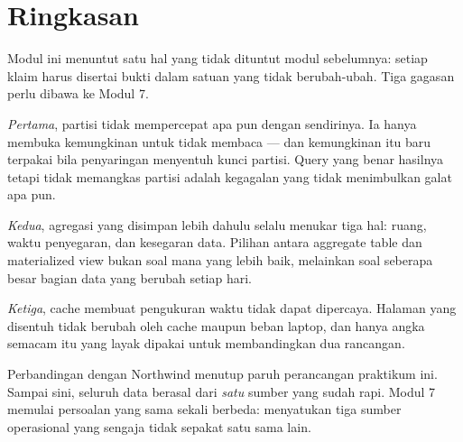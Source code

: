 \section{Ringkasan}

Modul ini menuntut satu hal yang tidak dituntut modul sebelumnya: setiap klaim
harus disertai bukti dalam satuan yang tidak berubah-ubah. Tiga gagasan perlu
dibawa ke Modul 7.

\emph{Pertama}, partisi tidak mempercepat apa pun dengan sendirinya. Ia hanya
membuka kemungkinan untuk tidak membaca --- dan kemungkinan itu baru terpakai
bila penyaringan menyentuh kunci partisi. Query yang benar hasilnya tetapi
tidak memangkas partisi adalah kegagalan yang tidak menimbulkan galat apa pun.

\emph{Kedua}, agregasi yang disimpan lebih dahulu selalu menukar tiga hal:
ruang, waktu penyegaran, dan kesegaran data. Pilihan antara aggregate table dan
materialized view bukan soal mana yang lebih baik, melainkan soal seberapa
besar bagian data yang berubah setiap hari.

\emph{Ketiga}, cache membuat pengukuran waktu tidak dapat dipercaya. Halaman
yang disentuh tidak berubah oleh cache maupun beban laptop, dan hanya angka
semacam itu yang layak dipakai untuk membandingkan dua rancangan.

Perbandingan dengan Northwind menutup paruh perancangan praktikum ini. Sampai
sini, seluruh data berasal dari \emph{satu} sumber yang sudah rapi. Modul 7
memulai persoalan yang sama sekali berbeda: menyatukan tiga sumber operasional
yang sengaja tidak sepakat satu sama lain.
